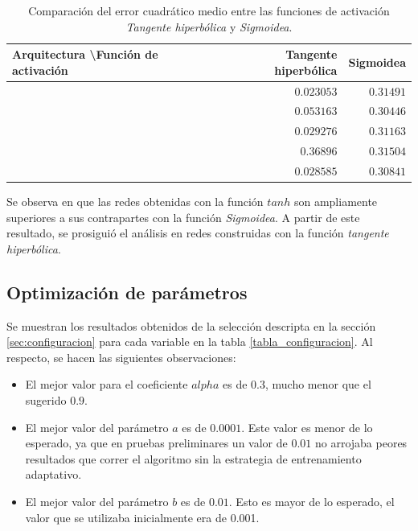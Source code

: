 \documentclass[a4paper,10pt]{article}
\begin{document}
     \begin{table}[H]

        \begin{center}
        \begin{tabular}{|l|r|r|}
            \hline
            Arquitectura \textbackslash Función de activación & Tangente hiperbólica & Sigmoidea \\
            \hline
            [2 5 4 1] & $0.023053$ & $0.31491$ \\
            \hline
            [3 10 6 1] & $0.053163$ & $0.30446$  \\
            \hline
            [2 10 6 1] & $0.029276$ & $0.31163$  \\
            \hline
            [2 4 2 1]  & $0.36896$ & $0.31504$  \\
            \hline
            [3 14 8 1] & $0.028585$ & $0.30841$  \\
            \hline
        \end{tabular}
        \end{center}
        \caption{Comparación del error cuadrático medio entre las funciones de activación \textit{Tangente hiperbólica} y \textit{Sigmoidea}.}
        \label{table-comparation-act-functions}

    \end{table}

    Se observa en \label{table-comparation-act-functions} que las redes obtenidas con la función $tanh$ son ampliamente superiores a sus contrapartes con la función \textit{Sigmoidea}.
    A partir de este resultado, se prosiguió el análisis en redes construidas con la función \textit{tangente hiperbólica}.

    \subsection{Optimización de parámetros}
    \label{sec:parametros-optimos}

        Se muestran los resultados obtenidos de la selección descripta en la sección \ref{sec:configuracion} para cada variable en la tabla \ref{tabla_configuracion}. 
        Al respecto, se hacen las siguientes observaciones:

        \begin{itemize}
        \item El mejor valor para el coeficiente $alpha$ es de $0.3$, mucho
        menor que el sugerido $0.9$.
        \item El mejor valor del parámetro $a$ es de $0.0001$. Este valor es menor de lo esperado, ya que en pruebas preliminares un valor de $0.01$ 
              no arrojaba peores resultados que correr el algoritmo sin la estrategia de entrenamiento adaptativo.
        \item El mejor valor del parámetro $b$ es de $0.01$. Esto es mayor de lo esperado, el valor que se utilizaba inicialmente era de 0.001.
        \end{itemize}
\end{document}
